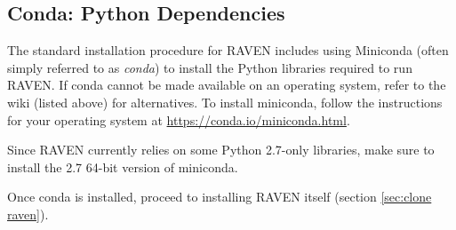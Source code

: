 \subsection{Conda: Python Dependencies}
\label{sec:install conda}

The standard installation procedure for RAVEN includes using Miniconda (often simply referred to as
\emph{conda}) to install the Python libraries required to run RAVEN.  If conda cannot be made available on an
operating system, refer to the wiki (listed above) for alternatives.  To install miniconda, follow the
instructions for your operating system at \url{https://conda.io/miniconda.html}.

\nb Since RAVEN currently relies
on some Python 2.7-only libraries, make sure to install the 2.7 64-bit version of miniconda.

Once conda is installed, proceed to installing RAVEN itself (section \ref{sec:clone raven}).
